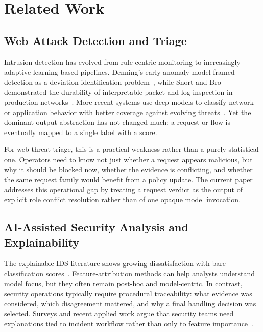 \section{Related Work}\label{sec:related}

\subsection{Web Attack Detection and Triage}

Intrusion detection has evolved from rule-centric monitoring to increasingly adaptive learning-based pipelines. Denning's early anomaly model framed detection as a deviation-identification problem~\cite{denning1987intrusion}, while Snort and Bro demonstrated the durability of interpretable packet and log inspection in production networks~\cite{roesch1999snort,paxson1999bro}. More recent systems use deep models to classify network or application behavior with better coverage against evolving threats~\cite{doriguzzi2020lucid,holdbrook2024survey}. Yet the dominant output abstraction has not changed much: a request or flow is eventually mapped to a single label with a score.

For web threat triage, this is a practical weakness rather than a purely statistical one. Operators need to know not just whether a request appears malicious, but why it should be blocked now, whether the evidence is conflicting, and whether the same request family would benefit from a policy update. The current paper addresses this operational gap by treating a request verdict as the output of explicit role conflict resolution rather than of one opaque model invocation.

\subsection{AI-Assisted Security Analysis and Explainability}

The explainable IDS literature shows growing dissatisfaction with bare classification scores~\cite{neupane2022xids}. Feature-attribution methods can help analysts understand model focus, but they often remain post-hoc and model-centric. In contrast, security operations typically require procedural traceability: what evidence was considered, which disagreement mattered, and why a final handling decision was selected. Surveys and recent applied work argue that security teams need explanations tied to incident workflow rather than only to feature importance~\cite{neupane2022xids,barrere2022autonomous}.

